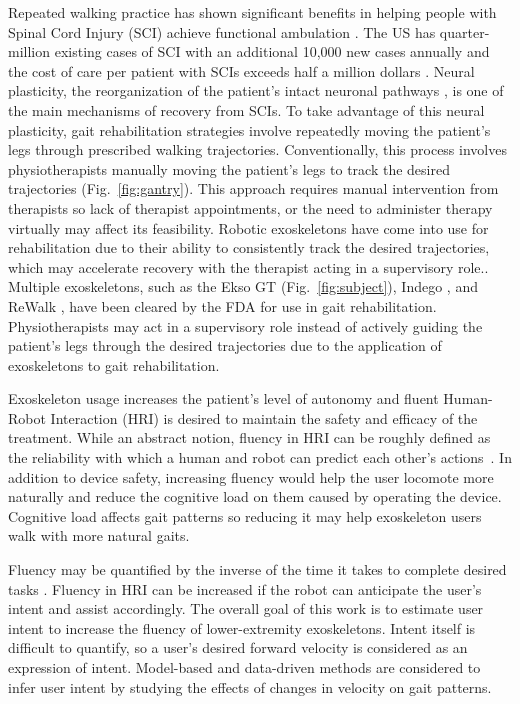 Repeated walking practice has shown significant benefits in helping people with Spinal Cord Injury (SCI) achieve functional ambulation \cite{lam2007systematic}. The US has quarter-million existing cases of SCI with an additional 10,000 new cases annually \cite{nih} and the cost of care per patient with SCIs exceeds half a million dollars \cite{devivo2011costs}. Neural plasticity, the reorganization of the patient's intact neuronal pathways \cite{curt2008recovery}, is one of the main mechanisms of recovery from SCIs. To take advantage of this neural plasticity, gait rehabilitation strategies involve repeatedly moving the patient's legs through prescribed walking trajectories. Conventionally, this process involves physiotherapists manually moving the patient's legs to track the desired trajectories (Fig.~\ref{fig:gantry}). %
This approach requires manual intervention from therapists so lack of therapist appointments, or the need to administer therapy virtually may affect its feasibility. Robotic exoskeletons have come into use for rehabilitation due to their ability to consistently track the desired trajectories, which may accelerate recovery \cite{hidler2011role} with the therapist acting in a supervisory role.. Multiple exoskeletons, such as the Ekso GT \cite{brenner2016exploring} (Fig.~\ref{fig:subject}), Indego \cite{sup2008design}, and ReWalk \cite{rewalk}, have been cleared by the FDA for use in gait rehabilitation. Physiotherapists may act in a supervisory role instead of actively guiding the patient's legs through the desired trajectories due to the application of exoskeletons to gait rehabilitation. 

Exoskeleton usage increases the patient's level of autonomy and fluent Human-Robot Interaction (HRI) is desired to maintain the safety and efficacy of the treatment. While an abstract notion, fluency in HRI can be roughly defined as the reliability with which a human and robot can predict each other's actions~\cite{hoffman2007cost}. In addition to device safety, increasing fluency would help the user locomote more naturally and reduce the cognitive load on them caused by operating the device. Cognitive load affects gait patterns \cite{bogen2018walk} so reducing it may help exoskeleton users walk with more natural gaits. 

Fluency may be quantified by the inverse of the time it takes to complete desired tasks \cite{hoffman2019evaluating}. Fluency in HRI can be increased if the robot can anticipate the user's intent and assist accordingly. The overall goal of this work is to estimate user intent to increase the fluency of lower-extremity exoskeletons. Intent itself is difficult to quantify, so a user's desired forward velocity is considered as an expression of intent. Model-based and data-driven methods are considered to infer user intent by studying the effects of changes in velocity on gait patterns.

